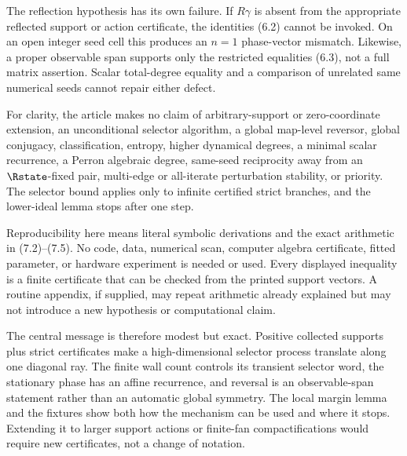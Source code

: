 \documentclass[11pt]{article}
\theoremstyle{definition}
\theoremstyle{remark}
\begin{document}
The reflection hypothesis has its own failure.  If $R\gamma$ is absent from
the appropriate reflected support or action certificate, the identities
(6.2) cannot be invoked.  On an open integer seed cell this produces an
$n=1$ phase-vector mismatch.  Likewise, a proper observable span supports
only the restricted equalities (6.3), not a full matrix assertion.  Scalar
total-degree equality and a comparison of unrelated same numerical seeds
cannot repair either defect.

For clarity, the article makes no claim of arbitrary-support or
zero-coordinate extension, an unconditional selector algorithm, a global
map-level reversor, global conjugacy, classification, entropy, higher
dynamical degrees, a minimal scalar recurrence, a Perron algebraic degree,
same-seed reciprocity away from an $\Rstate$-fixed pair, multi-edge or
all-iterate perturbation stability, or priority.  The selector bound applies
only to infinite certified strict branches, and the lower-ideal lemma stops
after one step.

Reproducibility here means literal symbolic derivations and the exact
arithmetic in (7.2)--(7.5).  No code, data, numerical scan, computer
algebra certificate, fitted parameter, or hardware experiment is needed or
used.  Every displayed inequality is a finite certificate that can be
checked from the printed support vectors.  A routine appendix, if supplied,
may repeat arithmetic already explained but may not introduce a new
hypothesis or computational claim.

The central message is therefore modest but exact.  Positive collected
supports plus strict certificates make a high-dimensional selector process
translate along one diagonal ray.  The finite wall count controls its
transient selector word, the stationary phase has an affine recurrence, and
reversal is an observable-span statement rather than an automatic global
symmetry.  The local margin lemma and the fixtures show both how the
mechanism can be used and where it stops.  Extending it to larger support
actions or finite-fan compactifications would require new certificates, not
a change of notation.



\end{document}
